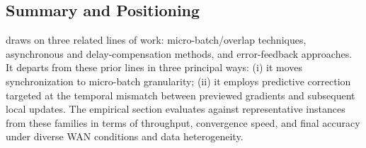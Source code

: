 \subsection{Summary and Positioning}
\sysname{} draws on three related lines of work: micro-batch/overlap techniques, asynchronous and delay-compensation methods, and error-feedback approaches. It departs from these prior lines in three principal ways: (i) it moves synchronization to micro-batch granularity; (ii) it employs predictive correction targeted at the temporal mismatch between previewed gradients and subsequent local updates. The empirical section evaluates \sysname{} against representative instances from these families in terms of throughput, convergence speed, and final accuracy under diverse WAN conditions and data heterogeneity.



